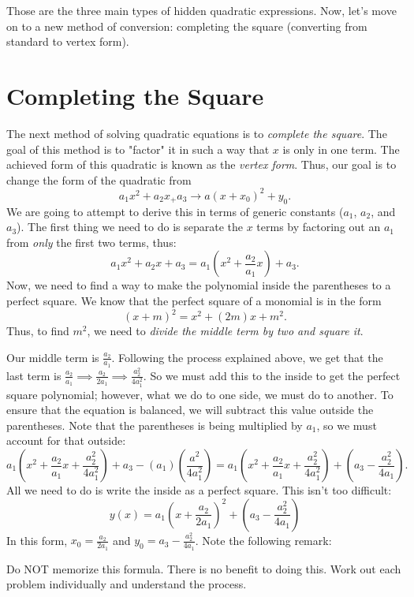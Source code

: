 \documentclass[../book.tex]{subfiles}
\begin{document}
Those are the three main types of hidden quadratic expressions.  Now, let's move on to a new method of conversion: completing the square (converting from standard to vertex form).
\section{Completing the Square}
\noindent The next method of solving quadratic equations is to \textit{complete the square}.  The goal of this method is to "factor" it in such a way that $x$ is only in one term.  The achieved form of this quadratic is known as the \textit{vertex form}.  Thus, our goal is to change the form of the quadratic from $$a_1x^2+a_2x_+a_3\longrightarrow a(x+x_0)^2+y_0.$$
We are going to attempt to derive this in terms of generic constants ($a_1$, $a_2$, and $a_3$).  The first thing we need to do is separate the $x$ terms by factoring out an $a_1$ from \textit{only} the first two terms, thus: $$a_1x^2+a_2x+a_3=a_1\left(x^2+\frac{a_2}{a_1}x\right)+a_3.$$  Now, we need to find a way to make the polynomial inside the parentheses to a perfect square.  We know that the perfect square of a monomial is in the form $$(x+m)^2=x^2+(2m)x+m^2.$$  Thus, to find $m^2$, we need to \textit{divide the middle term by two and square it}.

Our middle term is $\displaystyle \frac{a_2}{a_1}$.  Following the process explained above, we get that the last term is $\displaystyle \frac{a_2}{a_1} \implies \frac{a_2}{2a_1} \implies \frac{a_2^2}{4a_1^2}$.  So we must add this to the inside to get the perfect square polynomial; however, what we do to one side, we must do to another.  To ensure that the equation is balanced, we will subtract this value outside the parentheses.  Note that the parentheses is being multiplied by $a_1$, so we must account for that outside:
$$a_1\left(x^2+\frac{a_2}{a_1}x+\frac{a_2^2}{4a_1^2}\right)+a_3-\left(a_1\right)\left(\frac{a^2}{4a_1^2}\right)=a_1\left(x^2+\frac{a_2}{a_1}x+\frac{a_2^2}{4a_1^2}\right)+\left(a_3-\frac{a_2^2}{4a_1}\right).$$
All we need to do is write the inside as a perfect square.  This isn't too difficult:
$$y(x)=a_1\left(x+\frac{a_2}{2a_1}\right)^2+\left(a_3-\frac{a_2^2}{4a_1}\right)$$
In this form, $\displaystyle x_0=\frac{a_2}{2a_1}$ and $\displaystyle y_0=a_3-\frac{a_2^2}{4a_1}$.  Note the following remark:

\begin{remark}
  Do NOT memorize this formula.  There is no benefit to doing this.  Work out each problem individually and understand the process.
\end{remark}
\end{document}

